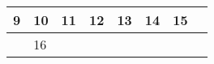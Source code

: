 {\begin{tabularx}{\linewidth}{|l!{\vrule width \myLenLineThicknessThick}*{7}{@{}X@{}|}}
      
      
        \begin{minipage}[t]{6mm}\centering{}9\end{minipage}
      
       & 
    
      
      
        \begin{minipage}[t]{6mm}\centering{}10\end{minipage}
      
       & 
    
      
      
        \begin{minipage}[t]{6mm}\centering{}11\end{minipage}
      
       & 
    
      
      
        \begin{minipage}[t]{6mm}\centering{}12\end{minipage}
      
       & 
    
      
      
        \begin{minipage}[t]{6mm}\centering{}13\end{minipage}
      
       & 
    
      
      
        \begin{minipage}[t]{6mm}\centering{}14\end{minipage}
      
       & 
    
      
      
        \begin{minipage}[t]{6mm}\centering{}15\end{minipage}
      
      
        \\  \hline 
      
    
  
  
  
  \hyperlink{week-2026-7}{} &
    
      
      
        \begin{minipage}[t]{6mm}\centering{}16\end{minipage}
      

\end{tabularx}}
